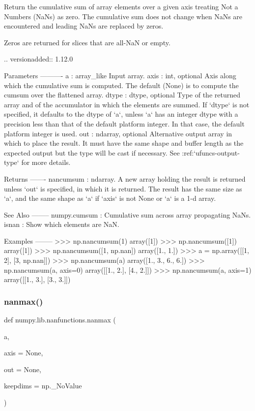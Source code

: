 \begin{DoxyVerb}Return the cumulative sum of array elements over a given axis treating Not a
Numbers (NaNs) as zero.  The cumulative sum does not change when NaNs are
encountered and leading NaNs are replaced by zeros.

Zeros are returned for slices that are all-NaN or empty.

.. versionadded:: 1.12.0

Parameters
----------
a : array_like
    Input array.
axis : int, optional
    Axis along which the cumulative sum is computed. The default
    (None) is to compute the cumsum over the flattened array.
dtype : dtype, optional
    Type of the returned array and of the accumulator in which the
    elements are summed.  If `dtype` is not specified, it defaults
    to the dtype of `a`, unless `a` has an integer dtype with a
    precision less than that of the default platform integer.  In
    that case, the default platform integer is used.
out : ndarray, optional
    Alternative output array in which to place the result. It must
    have the same shape and buffer length as the expected output
    but the type will be cast if necessary. See :ref:`ufuncs-output-type` for
    more details.

Returns
-------
nancumsum : ndarray.
    A new array holding the result is returned unless `out` is
    specified, in which it is returned. The result has the same
    size as `a`, and the same shape as `a` if `axis` is not None
    or `a` is a 1-d array.

See Also
--------
numpy.cumsum : Cumulative sum across array propagating NaNs.
isnan : Show which elements are NaN.

Examples
--------
>>> np.nancumsum(1)
array([1])
>>> np.nancumsum([1])
array([1])
>>> np.nancumsum([1, np.nan])
array([1.,  1.])
>>> a = np.array([[1, 2], [3, np.nan]])
>>> np.nancumsum(a)
array([1.,  3.,  6.,  6.])
>>> np.nancumsum(a, axis=0)
array([[1.,  2.],
       [4.,  2.]])
>>> np.nancumsum(a, axis=1)
array([[1.,  3.],
       [3.,  3.]])\end{DoxyVerb}
 \mbox{\label{namespacenumpy_1_1lib_1_1nanfunctions_a162941364126b496b7b4140a6fed4202}} 
\subsubsection{\texorpdfstring{nanmax()}{nanmax()}}
{\footnotesize\ttfamily def numpy.\+lib.\+nanfunctions.\+nanmax (\begin{DoxyParamCaption}\item[{}]{a,  }\item[{}]{axis = {\ttfamily None},  }\item[{}]{out = {\ttfamily None},  }\item[{}]{keepdims = {\ttfamily np.\+\_\+NoValue} }\end{DoxyParamCaption})}

